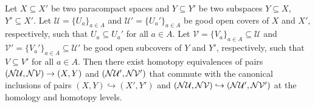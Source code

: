 \begin{lemma}\label{lem:rel_pers_nerve}
  Let $X\subseteq X'$ be two paracompact spaces and $Y\subseteq Y'$ be two subspaces $Y\subseteq X$, $Y'\subseteq X'$.
  Let $\mathcal{U} = \{U_a\}_{a\in A}$ and $\mathcal{U}' = \{U_a'\}_{a\in A}$ be good open covers of $X$ and $X'$, respectively, such that $U_a\subseteq U_a'$ for all $a\in A$.
  Let $\mathcal{V} = \{V_a\}_{a\in A} \subseteq \mathcal{U}$ and $\mathcal{V}' = \{V_a'\}_{a\in A}\subseteq \mathcal{U}'$ be good open subcovers of $Y$ and $Y'$, respectively, such that $V\subseteq V'$ for all $a\in A$.
  Then there exist homotopy equivalences of pairs $(\mathcal{N}\mathcal{U}, \mathcal{N}\mathcal{V})\to (X, Y)$ and $(\mathcal{N}\mathcal{U}', \mathcal{N}\mathcal{V}')$ that commute with the canonical inclusions of pairs $(X, Y)\hookrightarrow (X', Y')$ and $(\mathcal{N}\mathcal{U}, \mathcal{N}\mathcal{V})\hookrightarrow (\mathcal{N}\mathcal{U}', \mathcal{N}\mathcal{V}')$ at the homology and homotopy levels.
\end{lemma}

%



